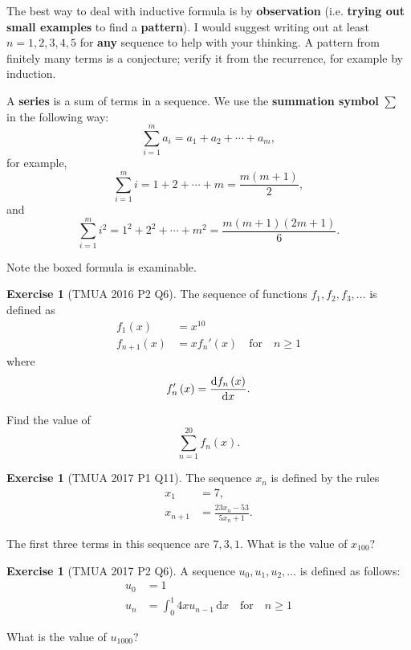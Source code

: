 \documentclass[11pt]{article}
\theoremstyle{definition}
\newtheorem{example}[theorem]{Exercise}
\theoremstyle{remark}
\newcommand{\pqty}[1]{\left(#1\right)}
\newcommand{\qfor}{\quad\text{for}\quad}
\newcommand{\dd}[1]{\,\mathrm{d}#1}
\begin{document}
The best way to deal with inductive formula is by \textbf{observation} (i.e. \textbf{trying out small examples} to find a \textbf{pattern}). I would suggest writing out at least \(n = 1, 2, 3, 4, 5\) for \textbf{any} sequence to help with your thinking. A pattern from finitely many terms is a conjecture; verify it from the recurrence, for example by induction.

A \textbf{series} is a sum of terms in a sequence. We use the \textbf{summation symbol} \(\sum\) in the following way:
\[
    \sum_{i = 1}^{m} a_i = a_1 + a_2 + \cdots + a_m,
\]
for example,
\[
    \boxed{\sum_{i = 1}^{m} i = 1 + 2 + \cdots + m = \frac{m \pqty{m + 1}}{2},}
\]
and
\[
    \sum_{i = 1}^{m} i^2 = 1^2 + 2^2 + \cdots + m^2 = \frac{m \pqty{m + 1} \pqty{2m + 1}}{6}.
\]

Note the boxed formula is examinable.

\begin{example}[TMUA 2016 P2 Q6]\label{tmua-4-unit-001}
    The sequence of functions \(f_1, f_2, f_3, \ldots\) is defined as
    \begin{align*}
        f_1 \pqty{x} &= x^{10} \\
        f_{n + 1} \pqty{x} &= x f_n'\pqty{x} \qfor n \geq 1
    \end{align*}
    where
    \[
        f'_n \pqty{x} = \dv{f_n\pqty{x}}{x}.
    \]

    Find the value of
    \[
        \sum_{n = 1}^{20} f_n \pqty{x}.
    \]
\end{example}

\begin{example}[TMUA 2017 P1 Q11]\label{tmua-4-unit-002}
    The sequence \(x_n\) is defined by the rules
    \begin{align*}
        x_1 &= 7, \\
        x_{n + 1} &= \frac{23 x_n - 53}{5 x_n + 1}.
    \end{align*}

    The first three terms in this sequence are \(7, 3, 1\). What is the value of \(x_{100}\)?
\end{example}

\begin{example}[TMUA 2017 P2 Q6]\label{tmua-4-unit-003}
    A sequence \(u_0, u_1, u_2, \ldots\) is defined as follows:
    \begin{align*}
        u_0 &= 1 \\
        u_n &= \int_{0}^{1} 4x u_{n - 1} \dd{x} \qfor n \geq 1
    \end{align*}

    What is the value of \(u_{1000}\)?
\end{example}
\end{document}
